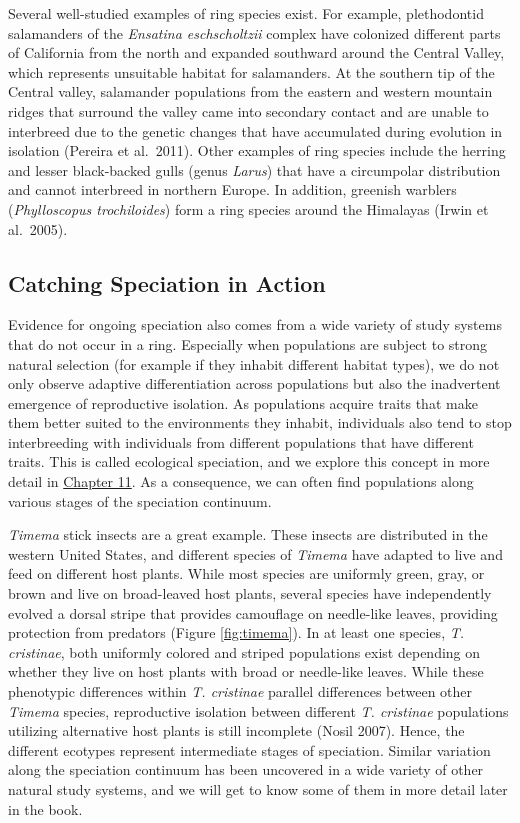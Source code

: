 \documentclass[
]{book}
\begin{document}
Several well-studied examples of ring species exist. For example, plethodontid salamanders of the \emph{Ensatina eschscholtzii} complex have colonized different parts of California from the north and expanded southward around the Central Valley, which represents unsuitable habitat for salamanders. At the southern tip of the Central valley, salamander populations from the eastern and western mountain ridges that surround the valley came into secondary contact and are unable to interbreed due to the genetic changes that have accumulated during evolution in isolation (Pereira et al.~2011). Other examples of ring species include the herring and lesser black-backed gulls (genus \emph{Larus}) that have a circumpolar distribution and cannot interbreed in northern Europe. In addition, greenish warblers (\emph{Phylloscopus trochiloides}) form a ring species around the Himalayas (Irwin et al.~2005).

\hypertarget{catching-speciation-in-action}{%
\subsection{Catching Speciation in Action}\label{catching-speciation-in-action}}

Evidence for ongoing speciation also comes from a wide variety of study systems that do not occur in a ring. Especially when populations are subject to strong natural selection (for example if they inhabit different habitat types), we do not only observe adaptive differentiation across populations but also the inadvertent emergence of reproductive isolation. As populations acquire traits that make them better suited to the environments they inhabit, individuals also tend to stop interbreeding with individuals from different populations that have different traits. This is called ecological speciation, and we explore this concept in more detail in \href{speciation-1.html}{Chapter 11}. As a consequence, we can often find populations along various stages of the speciation continuum.

\emph{Timema} stick insects are a great example. These insects are distributed in the western United States, and different species of \emph{Timema} have adapted to live and feed on different host plants. While most species are uniformly green, gray, or brown and live on broad-leaved host plants, several species have independently evolved a dorsal stripe that provides camouflage on needle-like leaves, providing protection from predators (Figure \ref{fig:timema}). In at least one species, \emph{T. cristinae}, both uniformly colored and striped populations exist depending on whether they live on host plants with broad or needle-like leaves. While these phenotypic differences within \emph{T. cristinae} parallel differences between other \emph{Timema} species, reproductive isolation between different \emph{T. cristinae} populations utilizing alternative host plants is still incomplete (Nosil 2007). Hence, the different ecotypes represent intermediate stages of speciation. Similar variation along the speciation continuum has been uncovered in a wide variety of other natural study systems, and we will get to know some of them in more detail later in the book.
\end{document}
